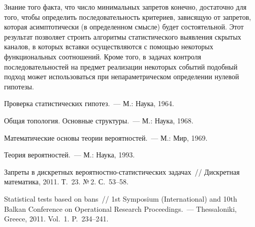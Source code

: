 \begin{multicols}{2}
  Знание того факта, что число минимальных запретов конечно, достаточно 
для того, чтобы определить последовательность критериев, зависящую от 
запретов, которая асимптотически (в определенном смысле) будет 
состоятельной. Этот результат позволяет строить алгоритмы статистического 
выявления скрытых каналов, в которых вставки осуществляются с помощью 
некоторых функциональных соотношений. 
Кроме того, в задачах контроля 
последовательностей на предмет реализации некоторых событий подобный 
подход может использоваться при непараметрическом определении нулевой 
ги\-по\-тезы. 
{ %

}
  
  
{\small\frenchspacing
{%
\begin{thebibliography}{9}
  
 Проверка статистических гипотез.~--- М.: Наука, 1964.

 Общая топология. Основные структуры.~--- М.: Наука, 1968.

 Математические основы теории вероятностей.~--- М.: Мир, 1969.


 Теория вероятностей.~--- М.: Наука, 1993.

 Запреты в дискретных ве\-ро\-ят\-но\-ст\-но-ста\-ти\-сти\-че\-ских 
задачах~// Дискретная математика, 2011. Т.~23. №\,2. С.~53--58.

\label{end\stat}

 Statistical tests based on bans~// 1st Symposium 
(International) and 10th Balkan Conference on Operational Research 
Proceedings.~---  Thessaloniki, Greece, 2011. Vol.~1. P.~234--241.  
\end{thebibliography}
}
}

\end{multicols}